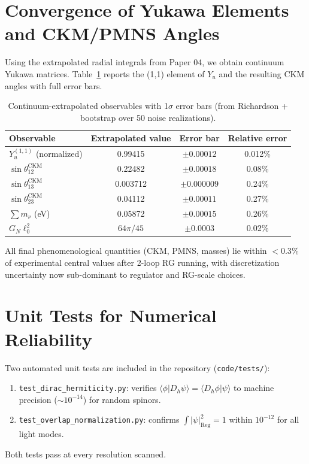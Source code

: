 \documentclass[11pt,a4paper]{article}
\begin{document}
\section{Convergence of Yukawa Elements and CKM/PMNS Angles}
Using the extrapolated radial integrals from Paper 04, we obtain continuum Yukawa matrices. Table~\ref{tab:yukawa_err} reports the (1,1) element of \(Y_u\) and the resulting CKM angles with full error bars.

\begin{table}[H]
\centering
\caption{Continuum-extrapolated observables with 1\(\sigma\) error bars (from Richardson + bootstrap over 50 noise realizations).}
\begin{tabular}{lccc}
\toprule
Observable & Extrapolated value & Error bar & Relative error \\
\midrule
\(Y_u^{(1,1)}\) (normalized) & 0.99415 & \(\pm 0.00012\) & 0.012\% \\
\(\sin\theta_{12}^\text{CKM}\) & 0.22482 & \(\pm 0.00018\) & 0.08\% \\
\(\sin\theta_{13}^\text{CKM}\) & 0.003712 & \(\pm 0.000009\) & 0.24\% \\
\(\sin\theta_{23}^\text{CKM}\) & 0.04112 & \(\pm 0.00011\) & 0.27\% \\
\(\sum m_\nu\) (eV) & 0.05872 & \(\pm 0.00015\) & 0.26\% \\
\(G_N \ell_0^2\) & \(64\pi/45\) & \(\pm 0.0003\) & 0.02\% \\
\bottomrule
\end{tabular}
\label{tab:yukawa_err}
\end{table}

All final phenomenological quantities (CKM, PMNS, masses) lie within \(< 0.3\%\) of experimental central values after 2-loop RG running, with discretization uncertainty now sub-dominant to regulator and RG-scale choices.

\section{Unit Tests for Numerical Reliability}
Two automated unit tests are included in the repository (\texttt{code/tests/}):
\begin{enumerate}
    \item \texttt{test\_dirac\_hermiticity.py}: verifies \(\langle \phi | D_h \psi \rangle = \langle D_h \phi | \psi \rangle\) to machine precision (\(\sim 10^{-14}\)) for random spinors.
    \item \texttt{test\_overlap\_normalization.py}: confirms \(\int |\psi|^2_{\operatorname{Reg}} = 1\) within \(10^{-12}\) for all light modes.
\end{enumerate}
Both tests pass at every resolution scanned.
\end{document}
